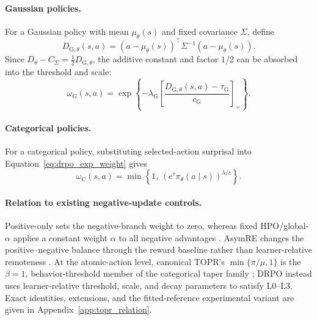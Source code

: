 \documentclass{article}
\theoremstyle{plain}
\theoremstyle{definition}
\theoremstyle{remark}
\begin{document}
\paragraph{Gaussian policies.}
For a Gaussian policy with mean \(\mu_\theta(s)\) and fixed covariance
\(\Sigma\), define
\begin{equation}
    D_{\mathrm G,\theta}(s,a)
    =
    (a-\mu_\theta(s))^\top
    \Sigma^{-1}
    (a-\mu_\theta(s)).
    \label{eq:gaussian_squared_distance}
\end{equation}
Since \(D_\theta-C_\Sigma=\frac12D_{\mathrm G,\theta}\), the additive
constant and factor \(1/2\) can be absorbed into the threshold and scale:
\begin{equation}
    \omega_{\mathrm G}(s,a)
    =
    \exp
    \left\{
        -\lambda_{\mathrm G}
        \left[
            \frac{D_{\mathrm G,\theta}(s,a)-\tau_{\mathrm G}}
                 {c_{\mathrm G}}
        \right]_{+}
    \right\}.
    \label{eq:drpo_gaussian_weight}
\end{equation}

\paragraph{Categorical policies.}
For a categorical policy, substituting selected-action surprisal into
Equation~\eqref{eq:drpo_exp_weight} gives
\begin{equation}
    \omega_{\mathrm C}(s,a)
    =
    \min
    \left\{
        1,\,
        \left(e^{\tau}\pi_\theta(a\mid s)\right)^{\lambda/c}
    \right\}.
    \label{eq:drpo_categorical_weight}
\end{equation}
\paragraph{Relation to existing negative-update controls.}
Positive-only sets the negative-branch weight to zero, whereas fixed
HPO/global-\(\alpha\) applies a constant weight \(\alpha\) to all
negative advantages \citep{sana2026hpo}. AsymRE changes the
positive--negative balance through the reward baseline rather than
learner-relative remoteness \citep{arnal2025asymmetric}. At the
atomic-action level, canonical TOPR's \(\min\{\pi/\mu,1\}\) is the
\(\beta=1\), behavior-threshold member of the categorical taper family
\citep{leroux2025tapered}; DRPO instead uses learner-relative threshold,
scale, and decay parameters to satisfy L0--L3. Exact identities,
extensions, and the fitted-reference experimental variant are given in
Appendix~\ref{app:topr_relation}.
\end{document}
